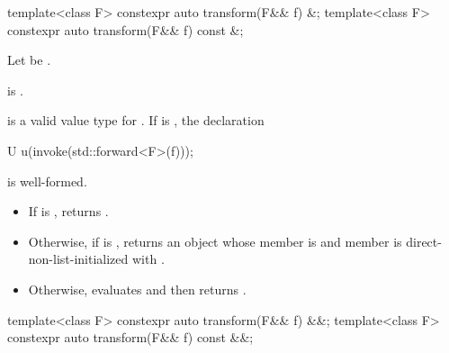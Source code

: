 %
\begin{itemdecl}
template<class F> constexpr auto transform(F&& f) &;
template<class F> constexpr auto transform(F&& f) const &;
\end{itemdecl}

\begin{itemdescr}
\pnum
Let  be .

\pnum
\constraints
{} is .

\pnum
\mandates
{} is a valid value type for . If  is
, the declaration
\begin{codeblock}
U u(invoke(std::forward<F>(f)));
\end{codeblock}
is well-formed.

\pnum
\effects
\begin{itemize}
\item
If  is , returns
.
\item
Otherwise, if  is , returns an
 object whose  member is  and
 member is direct-non-list-initialized with
.
\item
Otherwise, evaluates  and then returns
.
\end{itemize}
\end{itemdescr}

%
\begin{itemdecl}
template<class F> constexpr auto transform(F&& f) &&;
template<class F> constexpr auto transform(F&& f) const &&;
\end{itemdecl}

